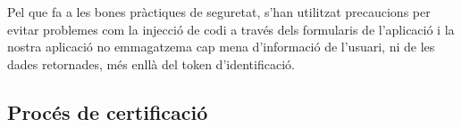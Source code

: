     Pel que fa a les bones pràctiques de seguretat, s'han utilitzat precaucions per evitar problemes com la injecció de codi a través dels formularis de l'aplicació i la nostra aplicació no emmagatzema cap mena d'informació de l'usuari, ni de les dades retornades, més enllà del token d'identificació.


    \subsection{Procés de certificació}
